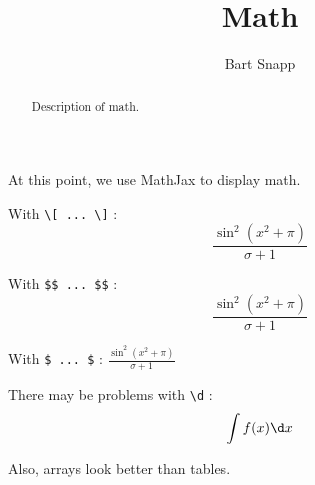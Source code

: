 \documentclass{ximera}
\title{Math}
\author{Bart Snapp}
\begin{document}
\begin{abstract}
  Description of math.
\end{abstract}
\maketitle

At this point, we use MathJax to display math.

With \verb|\[ ... \]| :
\[
\frac{\sin^2(x^2+\pi)}{\sigma + 1}
\]

With \verb|$$ ... $$| :
$$
\frac{\sin^2(x^2+\pi)}{\sigma + 1}
$$

With \verb|$ ... $| :
$
\frac{\sin^2(x^2+\pi)}{\sigma + 1}
$


There may be problems with \verb|\d| :
\[
\int f(x) \d x
\]


Also, arrays look better than tables.
\end{document}
